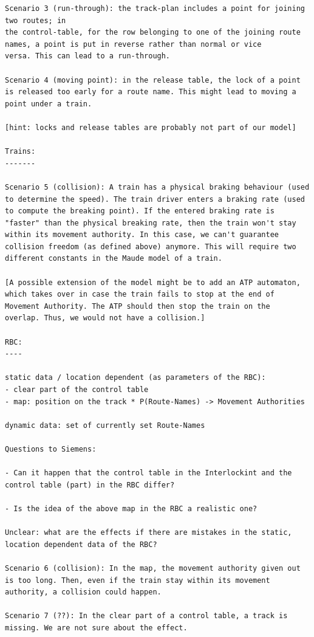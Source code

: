 \begin{verbatim}
Scenario 3 (run-through): the track-plan includes a point for joining two routes; in
the control-table, for the row belonging to one of the joining route
names, a point is put in reverse rather than normal or vice
versa. This can lead to a run-through.

Scenario 4 (moving point): in the release table, the lock of a point
is released too early for a route name. This might lead to moving a
point under a train.

[hint: locks and release tables are probably not part of our model]

Trains:
-------

Scenario 5 (collision): A train has a physical braking behaviour (used
to determine the speed). The train driver enters a braking rate (used
to compute the breaking point). If the entered braking rate is
"faster" than the physical breaking rate, then the train won't stay
within its movement authority. In this case, we can't guarantee
collision freedom (as defined above) anymore. This will require two
different constants in the Maude model of a train.

[A possible extension of the model might be to add an ATP automaton,
which takes over in case the train fails to stop at the end of
Movement Authority. The ATP should then stop the train on the
overlap. Thus, we would not have a collision.]

RBC:
----

static data / location dependent (as parameters of the RBC):
- clear part of the control table
- map: position on the track * P(Route-Names) -> Movement Authorities

dynamic data: set of currently set Route-Names

Questions to Siemens:

- Can it happen that the control table in the Interlockint and the
control table (part) in the RBC differ?

- Is the idea of the above map in the RBC a realistic one?

Unclear: what are the effects if there are mistakes in the static,
location dependent data of the RBC?

Scenario 6 (collision): In the map, the movement authority given out
is too long. Then, even if the train stay within its movement
authority, a collision could happen.

Scenario 7 (??): In the clear part of a control table, a track is
missing. We are not sure about the effect.
\end{verbatim}

